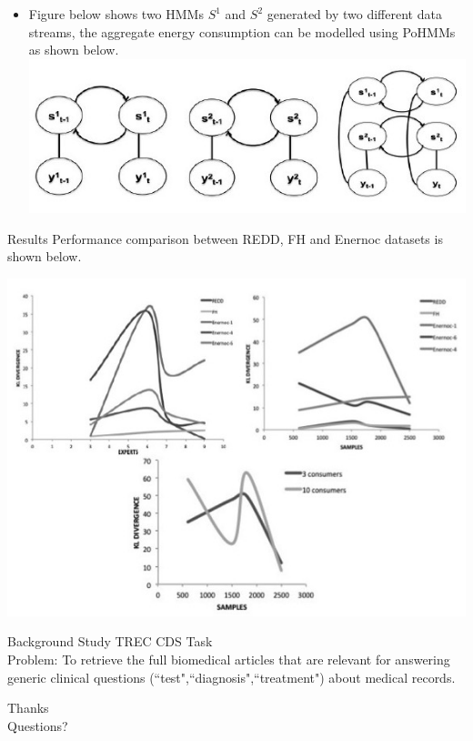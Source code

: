\documentclass{beamer}
\begin{document}
\begin{frame}
\begin{itemize}
\item Figure below shows two HMMs $S^1$ and $S^2$ generated by two different data streams, the aggregate energy consumption can be modelled using PoHMMs as shown below.
\includegraphics[height=1 in]{images/pohmm.jpg}
\end{itemize}
\end{frame}

\begin{frame}{Results}
Performance comparison between REDD, FH and Enernoc datasets is shown below.
\begin{center}
\includegraphics[height=2.5 in]{images/pohmm_res.jpg}
\end{center}
\end{frame}

\begin{frame}{Background Study}
TREC CDS Task\\
Problem: To retrieve the full biomedical articles that are relevant for answering generic clinical questions (``test",``diagnosis",``treatment") about medical records.



\end{frame}

%

%
%

\begin{frame}
    {\footnotesize
    
    
    }
\end{frame}

\begin{frame}
\begin{center}
Thanks \\
Questions?
\end{center}
\end{frame}
\end{document}
